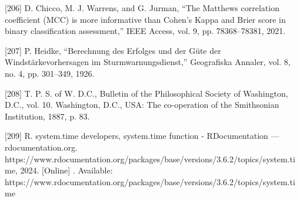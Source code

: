 \documentclass[sn-mathphys-num]{sn-jnl}%
\begin{document}
[206] D. Chicco, M. J. Warrens, and G. Jurman, “The Matthews correlation coefficient (MCC) is more informative than Cohen’s Kappa and Brier score in binary classification assessment,” IEEE Access, vol. 9, pp. 78368–78381, 2021.

[207] P. Heidke, “Berechnung des Erfolges und der Güte der Windstärkevorhersagen im Sturmwarnungsdienst,” Geografiska Annaler, vol. 8, no. 4, pp. 301–349, 1926.

[208] T. P. S. of W. D.C., Bulletin of the Philosophical Society of Washington, D.C., vol. 10. Washington, D.C., USA: The co-operation of the Smithsonian Institution, 1887, p. 83.

[209] R. system.time developers, system.time function - RDocumentation — rdocumentation.org. https://www.rdocumentation.org/packages/base/versions/3.6.2/topics/system.time, 2024. [Online] . Available: https://www.rdocumentation.org/packages/base/versions/3.6.2/topics/system.time
\end{document}
